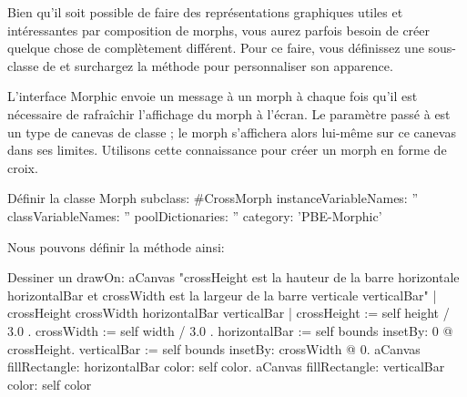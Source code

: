 \documentclass[a4paper,10pt,twoside]{book}
\begin{document}
Bien qu'il soit possible de faire des représentations graphiques
utiles et intéressantes par composition de morphs, vous aurez
parfois besoin de créer quelque chose de complètement différent.
Pour ce faire, vous définissez une sous-classe de  et
surchargez la méthode  pour personnaliser son
apparence.

L'interface Morphic envoie un message  à un morph à
chaque fois qu'il est nécessaire de rafraîchir l'affichage du
morph à l'écran. Le paramètre passé à  est un
type de canevas de classe ; le morph s'affichera alors
lui-même sur ce canevas dans ses limites. %
Utilisons cette connaissance pour créer un morph en forme de croix.

\begin{classdef}{Définir la classe }
Morph subclass: #CrossMorph
	instanceVariableNames: ''
	classVariableNames: ''
	poolDictionaries: ''
	category: 'PBE-Morphic'
\end{classdef}

Nous pouvons définir la méthode  ainsi:
\begin{method}[firstDrawOn]{Dessiner un }
drawOn: aCanvas 
	"crossHeight est la hauteur de la barre horizontale horizontalBar
    et crossWidth est la largeur de la barre verticale verticalBar"
    | crossHeight crossWidth horizontalBar verticalBar |
	crossHeight := self height / 3.0 .
	crossWidth := self width / 3.0 .
	horizontalBar := self bounds insetBy: 0 @ crossHeight.
	verticalBar := self bounds insetBy: crossWidth @ 0.
	aCanvas fillRectangle: horizontalBar color: self color.
	aCanvas fillRectangle: verticalBar color: self color
\end{method}
\end{document}
